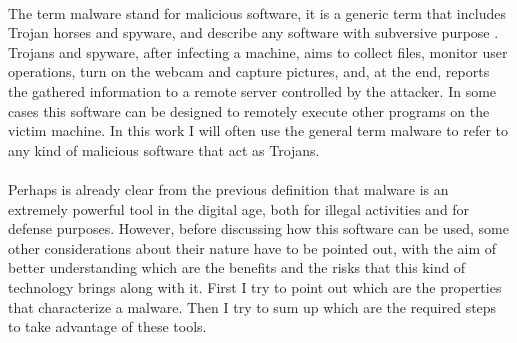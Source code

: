 \paragraph{}
The term malware stand for malicious software, it is a generic term that includes Trojan horses and spyware, and describe any software with subversive purpose \cite{malware_definition}.
Trojans and spyware, after infecting a machine, aims to collect files, monitor user operations, turn on the webcam and capture pictures, and, at the end, reports the gathered information to a remote server controlled by the attacker. In some cases this software can be designed to remotely execute other programs on the victim machine. 
In this work I will often use the general term malware to refer to any kind of malicious software that act as Trojans.

\paragraph{}
Perhaps is already clear from the previous definition that malware is an extremely powerful tool in the digital age, both for illegal activities and for defense purposes. However, before discussing how this software can be used, some other considerations about their nature have to be pointed out, with the aim of better understanding which are the benefits and the risks that this kind of technology brings along with it. First I try to point out which are the properties that characterize a malware. Then I try to sum up which are the required steps to take advantage of these tools.


